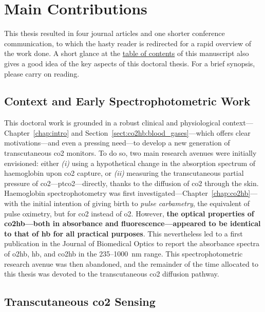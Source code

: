 \section{Main Contributions}

This thesis resulted in four journal articles and one shorter conference communication\cite{dervieux2020, dervieux2022, dervieux2023rate, dervieux2024phase, dervieux2024newcas}, to which the hasty reader is redirected for a rapid overview of the work done. A short glance at the \hyperref[chapter:toc]{table of contents} of this manuscript also gives a good idea of the key aspects of this doctoral thesis. For a brief synopsis, please carry on reading.

\subsection{Context and Early Spectrophotometric Work}

This doctoral work is grounded in a robust clinical and physiological context---Chapter~\ref{chap:intro} and Section~\ref{sect:co2hb:blood_gases}---which offers clear motivations---and even a pressing need---to develop a new generation of transcutaneous \gls{co2} monitors. To do so, two main research avenues were initially envisioned: either \textit{(i)} using a hypothetical change in the absorption spectrum of haemoglobin upon \gls{co2} capture, or \textit{(ii)} measuring the transcutaneous partial pressure of \gls{co2}---\gls{ptco2}---directly, thanks to the diffusion of \gls{co2} through the skin. Haemoglobin spectrophotometry was first investigated---Chapter~\ref{chap:co2hb}---with the initial intention of giving birth to \emph{pulse carbametry}, \ie{} the equivalent of pulse oximetry, but for \gls{co2} instead of \gls{o2}. However, \textbf{the optical properties of \gls{co2hb}---both in absorbance and fluorescence---appeared to be identical to that of \gls{hb} for all practical purposes}. This nevertheless led to a first publication in the Journal of Biomedical Optics to report the absorbance spectra of \gls{o2hb}, \gls{hb}, and \gls{co2hb} in the 235--1000~nm range\cite{dervieux2020}. This spectrophotometric research avenue was then abandoned, and the remainder of the time allocated to this thesis was devoted to the transcutaneous \gls{co2} diffusion pathway.

\subsection{Transcutaneous \texorpdfstring{\gls{co2}}{CO2} Sensing}

